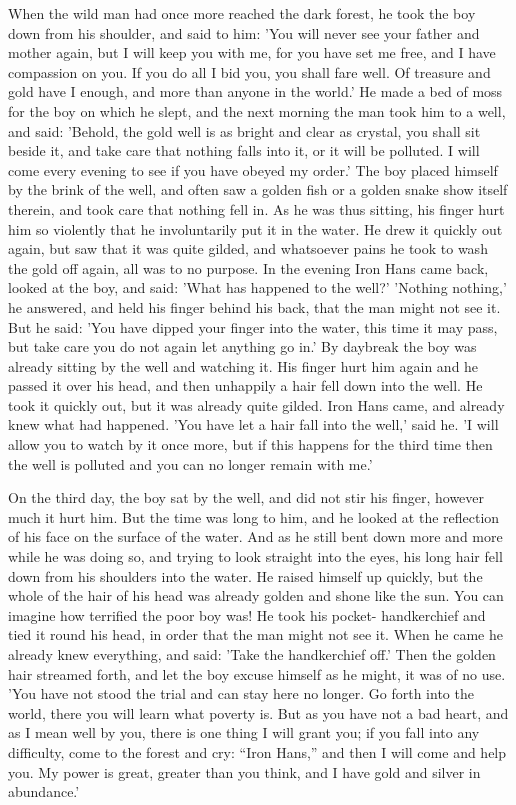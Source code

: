 \documentclass[12pt]{book}
\begin{document}
When the wild man had once more reached the dark forest, he took the
boy down from his shoulder, and said to him: 'You will never see your
father and mother again, but I will keep you with me, for you have set
me free, and I have compassion on you. If you do all I bid you, you
shall fare well. Of treasure and gold have I enough, and more than
anyone in the world.' He made a bed of moss for the boy on which he
slept, and the next morning the man took him to a well, and said:
'Behold, the gold well is as bright and clear as crystal, you shall
sit beside it, and take care that nothing falls into it, or it will be
polluted. I will come every evening to see if you have obeyed my
order.' The boy placed himself by the brink of the well, and often saw
a golden fish or a golden snake show itself therein, and took care
that nothing fell in. As he was thus sitting, his finger hurt him so
violently that he involuntarily put it in the water. He drew it
quickly out again, but saw that it was quite gilded, and whatsoever
pains he took to wash the gold off again, all was to no purpose. In
the evening Iron Hans came back, looked at the boy, and said: 'What
has happened to the well?' 'Nothing nothing,' he answered, and held
his finger behind his back, that the man might not see it. But he
said: 'You have dipped your finger into the water, this time it may
pass, but take care you do not again let anything go in.' By daybreak
the boy was already sitting by the well and watching it. His finger
hurt him again and he passed it over his head, and then unhappily a
hair fell down into the well. He took it quickly out, but it was
already quite gilded. Iron Hans came, and already knew what had
happened. 'You have let a hair fall into the well,' said he. 'I will
allow you to watch by it once more, but if this happens for the third
time then the well is polluted and you can no longer remain with me.'

On the third day, the boy sat by the well, and did not stir his
finger, however much it hurt him. But the time was long to him, and he
looked at the reflection of his face on the surface of the water. And
as he still bent down more and more while he was doing so, and trying
to look straight into the eyes, his long hair fell down from his
shoulders into the water. He raised himself up quickly, but the whole
of the hair of his head was already golden and shone like the sun. You
can imagine how terrified the poor boy was! He took his pocket-
handkerchief and tied it round his head, in order that the man might
not see it. When he came he already knew everything, and said: 'Take
the handkerchief off.' Then the golden hair streamed forth, and let
the boy excuse himself as he might, it was of no use. 'You have not
stood the trial and can stay here no longer. Go forth into the world,
there you will learn what poverty is. But as you have not a bad heart,
and as I mean well by you, there is one thing I will grant you; if you
fall into any difficulty, come to the forest and cry: ``Iron Hans,'' and
then I will come and help you. My power is great, greater than you
think, and I have gold and silver in abundance.'
\end{document}
